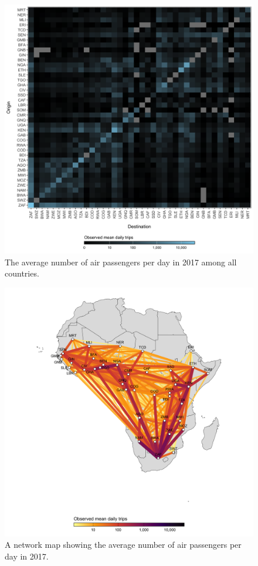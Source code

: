 \documentclass[
]{book}
\begin{document}
\begin{figure}

{\centering \includegraphics[width=1\linewidth]{figures/mobility_flight_data} 

}

\caption{The average number of air passengers per day in 2017 among all countries.}\label{fig:mobility-data}
\end{figure}
\begin{figure}

{\centering \includegraphics[width=1\linewidth]{figures/mobility_network} 

}

\caption{A network map showing the average number of air passengers per day in 2017.}\label{fig:mobility-network}
\end{figure}
\end{document}
